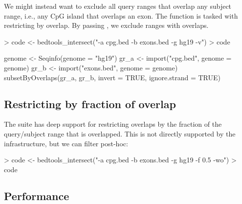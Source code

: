 \documentclass[10pt]{article}
\begin{document}
We might instead want to exclude all query ranges that overlap any
subject range, i.e., any CpG island that overlaps an exon. The
 function is tasked with restricting by
overlap. By passing , we exclude ranges with
overlaps.
\begin{Schunk}
\begin{Sinput}
> code <- bedtools_intersect("-a cpg.bed -b exons.bed -g hg19 -v")
> code
\end{Sinput}
\begin{Soutput}
{
    genome <- Seqinfo(genome = "hg19")
    gr_a <- import("cpg.bed", genome = genome)
    gr_b <- import("exons.bed", genome = genome)
    subsetByOverlaps(gr_a, gr_b, invert = TRUE, ignore.strand = TRUE)
}
\end{Soutput}
\end{Schunk}

\subsection{Restricting by fraction of overlap}

The  suite has deep support for restricting
overlaps by the fraction of the query/subject range that is
overlapped. This is not directly supported by the \Bioconductor{}
infrastructure, but we can filter post-hoc:
\begin{Schunk}
\begin{Sinput}
> code <- bedtools_intersect("-a cpg.bed -b exons.bed -g hg19 -f 0.5 -wo")
> code
\end{Sinput}
\end{Schunk}

\subsection{Performance}
\end{document}
